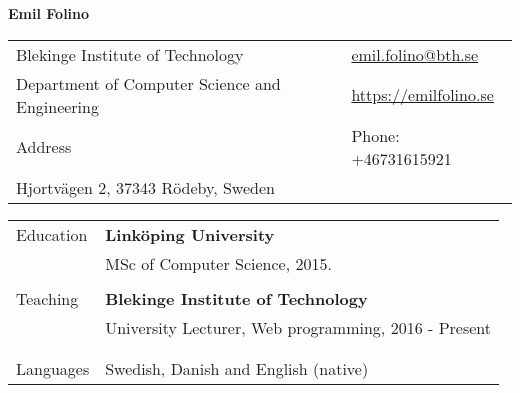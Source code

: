 \documentclass[letterpaper,11pt,oneside]{article}
\begin{document}

\noindent  \LARGE{\textbf{Emil Folino}}  \\
\vspace{-2ex}
\hline
\normalsize


\begin{center}
\begin{tabular}{l l}
 Blekinge Institute of Technology  & \hspace{1in} \href{mailto:emil.folino@bth.se}{emil.folino@bth.se} \\
 Department of Computer Science and Engineering    & \hspace{1in}  \href{https://emilfolino.se}{https://emilfolino.se}   \\
 Address             & \hspace{1in}  Phone: +46731615921 \\
 Hjortvägen 2, 37343 Rödeby, Sweden & \hspace{1in}  \\
\end{tabular}
\end{center}

\vspace{1em}


\noindent \begin{tabular}{@{} l l}
 \Large{Education}    & \textbf{Linköping University} \\
     & MSc of Computer Science, 2015. \\
     & \\
  \Large{Teaching}   & \textbf{Blekinge Institute of Technology} \\
     & University Lecturer, Web programming, 2016 - Present \\
     & \\
     & \\
  \Large{Languages}   & Swedish, Danish and English (native) \\
\end{tabular}
\end{document}
